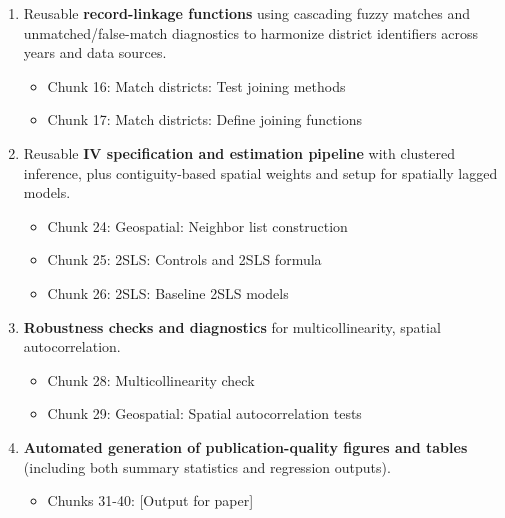 \documentclass[letterpaper,12pt]{article}
\begin{document}
\begin{enumerate}
\item[80-88:] 
Reusable \textbf{record-linkage functions} using cascading fuzzy matches and unmatched/false-match diagnostics to harmonize district identifiers across years and data sources.
\vspace{-2mm}
\begin{itemize}
\item Chunk 16: Match districts: Test joining methods
\vspace{-1mm}
\item Chunk 17: Match districts: Define joining functions
\end{itemize}
\vspace{-2mm}

\item[105-107:] Reusable \textbf{IV specification and estimation pipeline} with clustered inference, plus contiguity-based spatial weights and setup for spatially lagged models.
\vspace{-2mm}
\begin{itemize}
\item Chunk 24: Geospatial: Neighbor list construction
\vspace{-1mm}
\item Chunk 25: 2SLS: Controls and 2SLS formula
\vspace{-1mm}
\item Chunk 26: 2SLS: Baseline 2SLS models
\end{itemize}
\vspace{-2mm}

\item[111-112:] \textbf{Robustness checks and diagnostics} for multicollinearity, spatial autocorrelation.
\vspace{-2mm}
\begin{itemize}
\item Chunk 28: Multicollinearity check
\vspace{-1mm}
\item Chunk 29: Geospatial: Spatial autocorrelation tests
\end{itemize}
\vspace{-2mm}

\item[117-138:] \textbf{Automated generation of publication-quality figures and tables} (including both summary statistics and regression outputs).
\vspace{-2mm}
\begin{itemize}
\item Chunks 31-40: [Output for paper]
\end{itemize}
\vspace{-2mm}

\end{enumerate}
\end{document}
